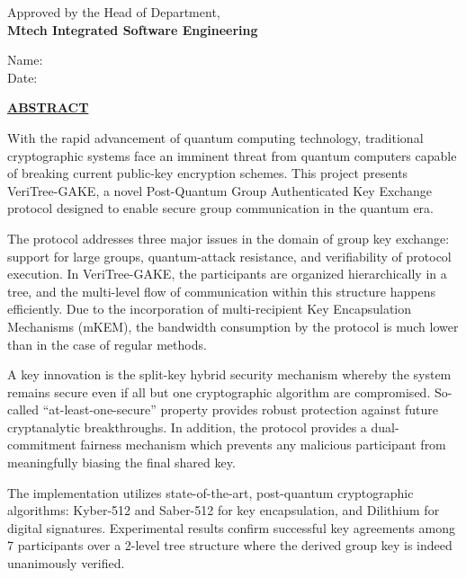 \documentclass[12pt,a4paper]{report}
\begin{document}
\vspace{3cm}

\noindent Approved by the Head of Department,\\
\textbf{Mtech Integrated Software Engineering}

\noindent Name:\\
\noindent Date: 


\newpage
\thispagestyle{empty}

\begin{center}
{\fontsize{14}{17}\bfseries\underline{ABSTRACT}}
\end{center}

\vspace{0.5cm}

With the rapid advancement of quantum computing technology, traditional cryptographic systems face an imminent threat from quantum computers capable of breaking current public-key encryption schemes. This project presents VeriTree-GAKE, a novel Post-Quantum Group Authenticated Key Exchange protocol designed to enable secure group communication in the quantum era.

The protocol addresses three major issues in the domain of group key exchange: support for large groups, quantum-attack resistance, and verifiability of protocol execution. In VeriTree-GAKE, the participants are organized hierarchically in a tree, and the multi-level flow of communication within this structure happens efficiently. Due to the incorporation of multi-recipient Key Encapsulation Mechanisms (mKEM), the bandwidth consumption by the protocol is much lower than in the case of regular methods.

A key innovation is the split-key hybrid security mechanism whereby the system remains secure even if all but one cryptographic algorithm are compromised. So-called ``at-least-one-secure'' property provides robust protection against future cryptanalytic breakthroughs. In addition, the protocol provides a dual-commitment fairness mechanism which prevents any malicious participant from meaningfully biasing the final shared key.

The implementation utilizes state-of-the-art, post-quantum cryptographic algorithms: Kyber-512 and Saber-512 for key encapsulation, and Dilithium for digital signatures. Experimental results confirm successful key agreements among 7 participants over a 2-level tree structure where the derived group key is indeed unanimously verified.
\end{document}
